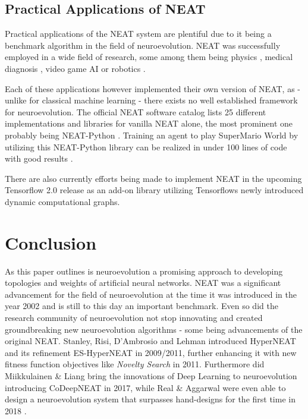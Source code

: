 \documentclass[journal, a4paper]{IEEEtran}
\begin{document}

\subsection{Practical Applications of NEAT}

Practical applications of the NEAT system are plentiful due to it being a benchmark algorithm in the field of neuroevolution. NEAT was successfully employed in a wide field of research, some among them being physics \cite{aal09}, medical diagnosis \cite{fra18}, video game AI \cite{hau12} or robotics \cite{cul15}.

Each of these applications however implemented their own version of NEAT, as - unlike for classical machine learning - there exists no well established framework for neuroevolution. The official NEAT software catalog \cite{neat_software19} lists 25 different implementations and libraries for vanilla NEAT alone, the most prominent one probably being NEAT-Python \cite{cod19}. Training an agent to play SuperMario World by utilizing this NEAT-Python library can be realized in under 100 lines of code with good results \cite{pau19_smw}.

There are also currently efforts being made \cite{pau19_tefne} to implement NEAT in the upcoming Tensorflow 2.0 \cite{tf_beta19} release as an add-on \cite{tf_addons19} library utilizing Tensorflows newly introduced dynamic computational graphs.




\section{Conclusion}

As this paper outlines is neuroevolution a promising approach to developing topologies and weights of artificial neural networks. NEAT was a significant advancement for the field of neuroevolution at the time it was introduced in the year 2002 and is still to this day an important benchmark. Even so did the research community of neuroevolution not stop innovating and created groundbreaking new neuroevolution algorithms - some being advancements of the original NEAT. Stanley, Risi, D'Ambrosio and Lehman introduced HyperNEAT \cite{sta09} and its refinement ES-HyperNEAT \cite{ris11} in 2009/2011, further enhancing it with new fitness function objectives like \textit{Novelty Search} \cite{leh11} in 2011. Furthermore did Miikkulainen \& Liang bring the innovations of Deep Learning to neuroevolution introducing CoDeepNEAT \cite{mii17} in 2017, while Real \& Aggarwal were even able to design a neuroevolution system that surpasses hand-designs for the first time in 2018 \cite{rea19}.
\end{document}

